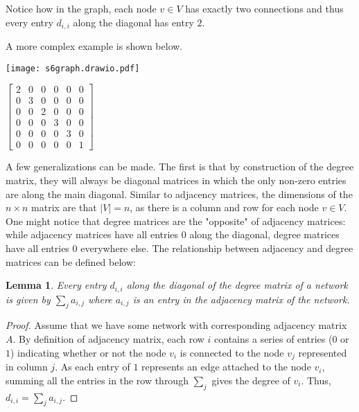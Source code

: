 \documentclass{article}
\newtheorem{lemma}[theorem]{Lemma}
\begin{document}
\bigskip

Notice how in the graph, each node $v\in V$ has exactly two connections and thus every entry $d_{i, i}$ along the diagonal has entry $2$.


\bigskip

\noindent A more complex example is shown below.

\bigskip

\noindent\begin{minipage}{.5\textwidth}
\centering
\texttt{[image: s6graph.drawio.pdf]}
\label{fig:fig5}            
\end{minipage}%
\begin{minipage}{.5\textwidth}
\centering
\vspace{0.5cm}
$\begin{bmatrix}
2 & 0 & 0 & 0 & 0 & 0\\
0 & 3 & 0 & 0 & 0 & 0\\
0 & 0 & 2 & 0 & 0 & 0\\
0 & 0 & 0 & 3 & 0 & 0\\
0 & 0 & 0 & 0 & 3 & 0\\
0 & 0 & 0 & 0 & 0 & 1
\end{bmatrix}$
\vspace{0.5cm}

\label{fig:fig6}            
\end{minipage}

\bigskip

A few generalizations can be made. The first is that by construction of the degree matrix, they will always be diagonal matrices in which the only non-zero entries are along the main diagonal. 
Similar to adjacency matrices, the dimensions of the $n \times n$ matrix are that $|V| = n$, as there is a column and row for each node $v \in V$.
One might notice that degree matrices are the "opposite" of adjacency matrices: while adjacency matrices have all entries $0$ along the diagonal, degree matrices have all entries $0$ everywhere else. 
The relationship between adjacency and degree matrices can be defined below:

\begin{lemma}
Every entry $d_{i,i}$ along the diagonal of the degree matrix of a network is given by $\sum_j a_{i,j}$ where $a_{i,j}$ is an entry in the adjacency matrix of the network.
\end{lemma}

\begin{proof}
Assume that we have some network with corresponding adjacency matrix $A$. By definition of adjacency matrix, each row $i$ contains a series of entries ($0$ or $1$) indicating whether or not the node $v_i$ is connected to the node $v_j$ represented in column $j$. As each entry of $1$ represents an edge attached to the node $v_i$, summing all the entries in the row through $\sum_j$ gives the degree of $v_i$. Thus, $d_{i,i} = \sum_j a_{i,j}$.

\end{proof}
\end{document}
